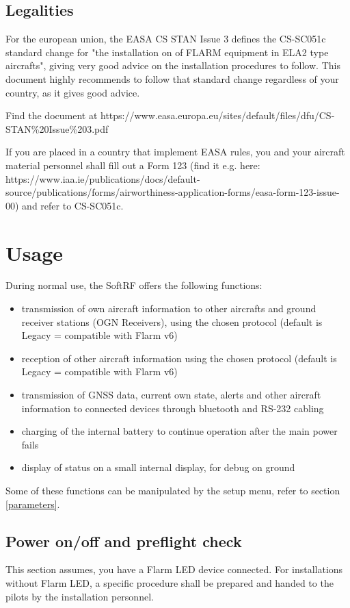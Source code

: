 \documentclass[11pt,a4paper]{article}
\begin{document}
\subsection{Legalities}
For the european union, the EASA CS STAN Issue 3 defines the CS-SC051c standard change for "the installation on of FLARM equipment in ELA2 type aircrafts", giving very good advice on the installation procedures to follow. This document highly recommends to follow that standard change regardless of your country, as it gives good advice.

Find the document at https://www.easa.europa.eu/sites/default/files/dfu/CS-STAN\%20Issue\%203.pdf

If you are placed in a country that implement EASA rules, you and your aircraft material personnel shall fill out a Form 123 (find it e.g. here: https://www.iaa.ie/publications/docs/default-source/publications/forms/airworthiness-application-forms/easa-form-123-issue-00) and refer to CS-SC051c.

\section{Usage}
During normal use, the SoftRF offers the following functions:

\begin{itemize}
\item transmission of own aircraft information to other aircrafts and ground receiver stations (OGN Receivers), using the chosen protocol (default is Legacy = compatible with Flarm v6)
\item reception of other aircraft information using the chosen protocol (default is Legacy = compatible with Flarm v6)
\item transmission of GNSS data, current own state, alerts and other aircraft information to connected devices through bluetooth and RS-232 cabling
\item charging of the internal battery to continue operation after the main power fails
\item display of status on a small internal display, for debug on ground
\end{itemize}

Some of these functions can be manipulated by the setup menu, refer to section \ref{parameters}.

\subsection{Power on/off and preflight check}\label{usage_power}
This section assumes, you have a Flarm LED device connected. For installations without Flarm LED, a specific procedure shall be prepared and handed to the pilots by the installation personnel.\\
\end{document}
